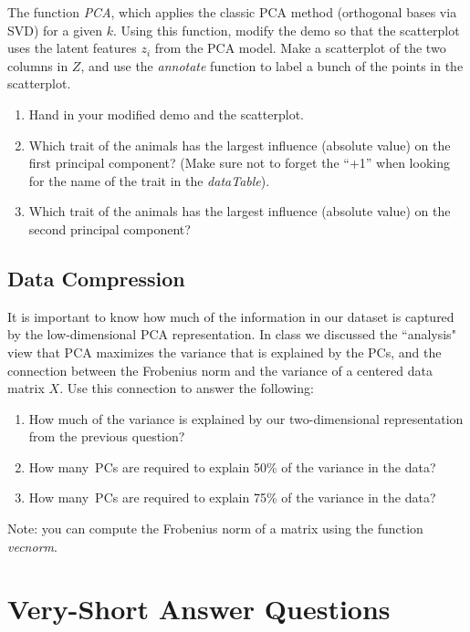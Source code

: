 \documentclass{article}
\def\blu#1{{\color{blu}#1}}
\def\enum#1{\begin{enumerate}#1\end{enumerate}}
\begin{document}
The function \emph{PCA}, which applies the classic PCA method (orthogonal bases via SVD) for a given $k$. Using this function, modify the demo so that the scatterplot uses the latent features $z_i$ from the PCA model. Make a scatterplot of the two columns in $Z$, and use the \emph{annotate} function to label a bunch of the points in the scatterplot.
\blu{
\enum{
\item  Hand in your modified demo and the scatterplot.
\item Which trait of the animals has the largest influence (absolute value) on the first principal component? (Make sure not to forget the ``+1'' when looking for the name of the trait in the \emph{dataTable}).
\item Which trait of the animals has the largest influence (absolute value) on the second principal component?
}
}


\subsection{Data Compression}

It is important to know how much of the information in our dataset is captured by the low-dimensional PCA representation.
In class we discussed the ``analysis" view that PCA maximizes the variance that is explained by the PCs, and the connection between the Frobenius norm and the variance of a centered data matrix $X$. Use this connection to answer the following:
\blu{\enum{
\item How much of the variance is explained by our two-dimensional representation from the previous question?
\item How many\ PCs are required to explain 50\% of the variance in the data?
\item How many\ PCs are required to explain 75\% of the variance in the data?
}}
Note: you can compute the Frobenius norm of a matrix using the function \emph{vecnorm}.




\section{Very-Short Answer Questions}
\end{document}
